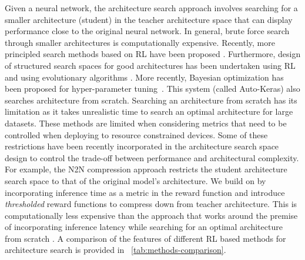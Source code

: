 \documentclass[../main]{subfiles}
\begin{document}
    Given a neural network, the architecture search approach involves searching for a smaller architecture (student) in the teacher architecture space that can display performance close to the original neural network.
    In general, brute force search through smaller architectures is computationally expensive.
    Recently, more principled search methods based on RL have been proposed \cite{zoph2016neural,baker2016designing}.
    Furthermore, design of structured search spaces for good architectures has been undertaken using RL~\cite{zoph2017learning} and using evolutionary algorithms \cite{real2018regularized,real2017large}.
    More recently, Bayesian optimization has been proposed for hyper-parameter tuning~\cite{jin2018efficient}.
    This system (called Auto-Keras) also searches architecture from scratch. Searching an architecture \cite{zoph2017learning,tan2018mnasnet} from scratch has its limitation as it takes unrealistic time to search an optimal architecture for large datasets.
    These methods are limited when considering metrics that need to be controlled when deploying to resource constrained devices.
    Some of these restrictions have been recently incorporated in the architecture search space design \cite{tan2018mnasnet,elsken2018multi,cheng2018searching,ashok2017n2n} to control the trade-off between performance and architectural complexity.
    For example, the N2N compression approach \cite{ashok2017n2n} restricts the student architecture search space to that of the original model's architecture.
    We build on \cite{ashok2017n2n} by incorporating inference time as a metric in the reward function and introduce \textit{thresholded} reward functions to compress down from teacher architecture.
    This is computationally less expensive than the approach that works around the premise of incorporating inference latency while searching for an optimal architecture from scratch \cite{tan2018mnasnet}.
    A comparison of the features of different RL based methods for architecture search is provided in \tablename~\ref{tab:methods-comparison}.
    

\end{document}
